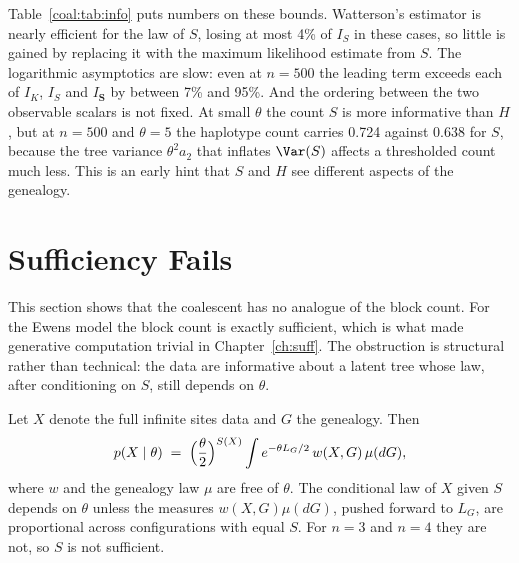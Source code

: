 Table~\ref{coal:tab:info} puts numbers on these bounds. Watterson's estimator is nearly efficient for the law of $S$, losing at most 4\% of $I_S$ in these cases, so little is gained by replacing it with the maximum likelihood estimate from $S$. The logarithmic asymptotics are slow: even at $n=500$ the leading term exceeds each of $I_K$, $I_S$ and $I_{\bm S}$ by between 7\% and 95\%. And the ordering between the two observable scalars is not fixed. At small $\theta$ the count $S$ is more informative than $H$, but at $n=500$ and $\theta=5$ the haplotype count carries 0.724 against 0.638 for $S$, because the tree variance $\theta^2a_2$ that inflates $\Var(S)$ affects a thresholded count much less. This is an early hint that $S$ and $H$ see different aspects of the genealogy.

\section{Sufficiency Fails}\label{coal:sec:suff}

This section shows that the coalescent has no analogue of the block count. For the Ewens model the block count is exactly sufficient, which is what made generative computation trivial in Chapter~\ref{ch:suff}. The obstruction is structural rather than technical: the data are informative about a latent tree whose law, after conditioning on $S$, still depends on $\theta$.

\begin{proposition}\label{coal:prop:notsuff}
Let $X$ denote the full infinite sites data and $G$ the genealogy. Then
\begin{equation}\label{coal:eq:lik}
p(X\mid\theta)\;=\;\Bigl(\frac\theta2\Bigr)^{S(X)}\int e^{-\theta L_G/2}\,w(X,G)\,\mu(dG),
\end{equation}
where $w$ and the genealogy law $\mu$ are free of $\theta$. The conditional law of $X$ given $S$ depends on $\theta$ unless the measures $w(X,G)\mu(dG)$, pushed forward to $L_G$, are proportional across configurations with equal $S$. For $n=3$ and $n=4$ they are not, so $S$ is not sufficient.
\end{proposition}

